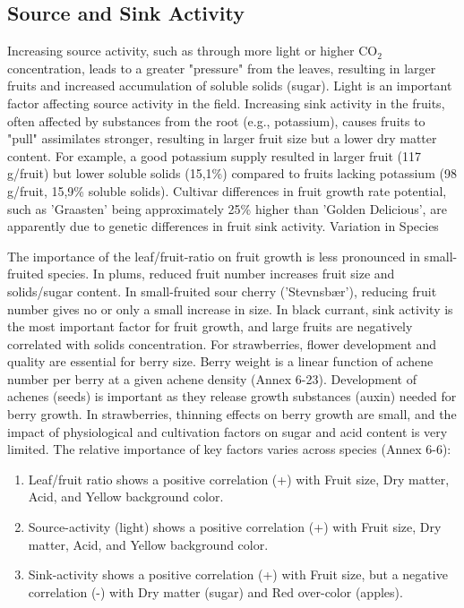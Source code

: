 \subsection*{Source and Sink Activity}
Increasing source activity, such as through more light or higher CO$_2$ concentration, leads to a greater "pressure" from the leaves, resulting in larger fruits and increased accumulation of soluble solids (sugar). Light is an important factor affecting source activity in the field. Increasing sink activity in the fruits, often affected by substances from the root (e.g., potassium), causes fruits to "pull" assimilates stronger, resulting in larger fruit size but a lower dry matter content. For example, a good potassium supply resulted in larger fruit (117 g/fruit) but lower soluble solids (15,1\%) compared to fruits lacking potassium (98 g/fruit, 15,9\% soluble solids). Cultivar differences in fruit growth rate potential, such as 'Graasten' being approximately 25\% higher than 'Golden Delicious', are apparently due to genetic differences in fruit sink activity.
Variation in Species

\vspace{0.5em}
The importance of the leaf/fruit-ratio on fruit growth is less pronounced in small-fruited species. In plums, reduced fruit number increases fruit size and solids/sugar content. In small-fruited sour cherry ('Stevnsbær'), reducing fruit number gives no or only a small increase in size. In black currant, sink activity is the most important factor for fruit growth, and large fruits are negatively correlated with solids concentration. For strawberries, flower development and quality are essential for berry size. Berry weight is a linear function of achene number per berry at a given achene density (Annex 6-23). Development of achenes (seeds) is important as they release growth substances (auxin) needed for berry growth. In strawberries, thinning effects on berry growth are small, and the impact of physiological and cultivation factors on sugar and acid content is very limited. The relative importance of key factors varies across species (Annex 6-6):

\begin{enumerate} 
    \item Leaf/fruit ratio shows a positive correlation (+) with Fruit size, Dry matter, Acid, and Yellow background color. 
    \item Source-activity (light) shows a positive correlation (+) with Fruit size, Dry matter, Acid, and Yellow background color. 
    \item Sink-activity shows a positive correlation (+) with Fruit size, but a negative correlation (-) with Dry matter (sugar) and Red over-color (apples). 
\end{enumerate}


